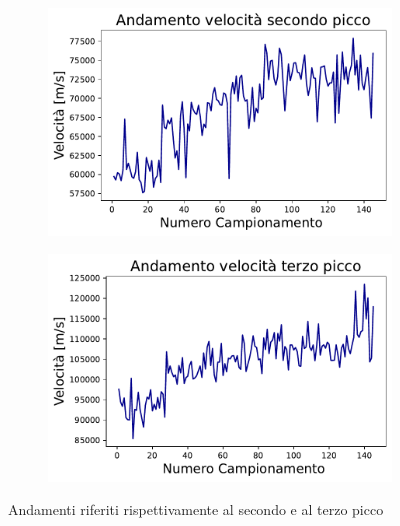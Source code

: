 \begin{figure}[H]
\centering

\begin{subfigure}[h!]{0.49\textwidth}
	\includegraphics[width=\textwidth]{Seconda_NO.pdf}
    \label{fig:sub1}
\end{subfigure}
\hfill
\begin{subfigure}[h!]{0.49\textwidth}
    \includegraphics[width=\textwidth]{Terza_NO.pdf}
    \label{fig:sub2}
\end{subfigure}
\caption{Andamenti riferiti rispettivamente al secondo e al terzo picco}
\end{figure}

